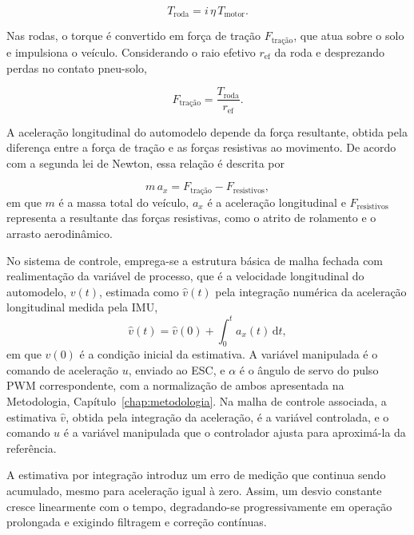 \begin{equation*}
T_{\mathrm{roda}} = i\,\eta\,T_{\mathrm{motor}}.
\end{equation*}

Nas rodas, o torque é convertido em força de tração \(F_{\text{tra\c{c}\~{a}o}}\), que atua sobre o solo e impulsiona 
o veículo. Considerando o raio efetivo \(r_{\mathrm{ef}}\) da roda e desprezando perdas no contato pneu-solo,

\begin{equation*}
F_{\text{tra\c{c}\~{a}o}} = \frac{T_{\mathrm{roda}}}{r_{\mathrm{ef}}}.
\end{equation*}

A aceleração longitudinal do automodelo depende da força resultante, obtida pela 
diferença entre a força de tração e as forças resistivas ao movimento. De acordo com a segunda lei de Newton,
essa relação é descrita por

\begin{equation}
\label{eq:newton}
m\,a_x = F_{\text{tra\c{c}\~{a}o}} - F_{\mathrm{resistivos}},
\end{equation}
em que \(m\) é a massa total do veículo, \(a_x\) é a aceleração longitudinal e \(F_{\mathrm{resistivos}}\) 
representa a resultante das forças resistivas, como o atrito de rolamento e o arrasto aerodinâmico.

No sistema de controle, emprega-se a estrutura básica de malha fechada com realimentação da
variável de processo, que é a velocidade longitudinal do automodelo, \(v(t)\), estimada como \(\hat{v}(t)\) pela
integração numérica da aceleração longitudinal medida pela IMU,
\begin{equation*}
\hat{v}(t) = \hat{v}(0) + \int_0^t a_x(t)\,\mathrm{d}t,
\end{equation*}
em que \(\hat{v}(0)\) é a condição inicial da estimativa.
A variável
manipulada é o comando de aceleração \(u\), enviado ao ESC, e \(\alpha\) é o ângulo de servo do
pulso PWM correspondente, com a normalização de ambos apresentada na Metodologia,
Capítulo~\ref{chap:metodologia}. Na malha de controle associada, a estimativa $\hat{v}$, obtida pela
integração da aceleração, é a variável controlada, e o comando $u$ é a variável manipulada
que o controlador ajusta para aproximá-la da referência.

A estimativa por integração introduz um erro de medição que continua
sendo acumulado, mesmo para aceleração igual à zero. Assim, um desvio constante cresce 
linearmente com o tempo, degradando-se progressivamente em operação prolongada e
exigindo filtragem e correção contínuas.

